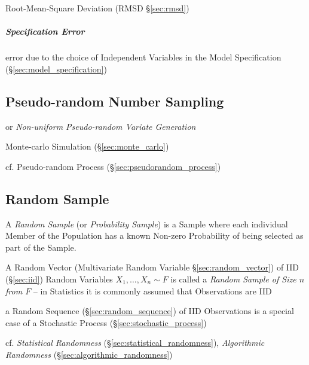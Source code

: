 \fist Root-Mean-Square Deviation (RMSD \S\ref{sec:rmsd})



\subparagraph{Specification Error}\label{sec:specification_error}\hfill


error due to the choice of Independent Variables in the Model Specification
(\S\ref{sec:model_specification})



\subsection{Pseudo-random Number Sampling}\label{sec:pseudorandom_sampling}

or \emph{Non-uniform Pseudo-random Variate Generation}

Monte-carlo Simulation (\S\ref{sec:monte_carlo})

cf. Pseudo-random Process (\S\ref{sec:pseudorandom_process})



\subsection{Random Sample}\label{sec:random_sample}

A \emph{Random Sample} (or \emph{Probability Sample}) is a Sample where each
individual Member of the Population has a known Non-zero Probability of being
selected as part of the Sample.

A Random Vector (Multivariate Random Variable \S\ref{sec:random_vector}) of IID
(\S\ref{sec:iid}) Random Variables $X_1, \ldots, X_n \sim F$ is called a
\emph{Random Sample of Size $n$ from $F$} -- in Statistics it is commonly
assumed that Observations are IID

 a Random Sequence (\S\ref{sec:random_sequence}) of IID Observations is a
 special case of a Stochastic Process (\S\ref{sec:stochastic_process})

\fist cf. \emph{Statistical Randomness} (\S\ref{sec:statistical_randomness}),
\emph{Algorithmic Randomness} (\S\ref{sec:algorithmic_randomness})

